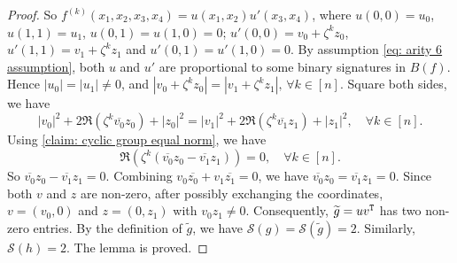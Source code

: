 \begin{proof}
    So $f^{(k)}(x_1,x_2,x_3,x_4)=u(x_1,x_2)u'(x_3,x_4)$, where $u(0,0)=u_0$, $u(1,1)=u_1$, $u(0,1)=u(1,0)=0$; $u'(0,0)=v_0+\zeta^k z_0$, $u'(1,1)=v_1+\zeta^k z_1$ and $u'(0,1)=u'(1,0)=0.$
    By assumption \eqref{eq: arity 6 assumption}, both $u$ and $u'$ are proportional to some binary signatures in $B(f)$.
    Hence $|u_0|=|u_1|\neq 0$, and $|v_0+\zeta^k z_0|=|v_1+\zeta^k z_1|,\,\forall k\in [n].$
    Square both sides, we have
    \begin{equation*}
        |v_0|^2+2\Re(\zeta^k\overline{v_0}z_0)+|z_0|^2=|v_1|^2+2\Re(\zeta^k\overline{v_1}z_1)+|z_1|^2,\quad \forall k\in[n].
    \end{equation*}
    Using \cref{claim: cyclic group equal norm}, we have 
    \begin{equation*}
        \Re(\zeta^k(\overline{v_0}z_0-\overline{v_1}z_1))=0,\quad \forall k\in [n].
    \end{equation*}
    So $\overline{v_0}z_0-\overline{v_1}z_1=0.$
    Combining $v_0\overline{z_0}+v_1\overline{z_1}=0$, we have $\overline{v_0}z_0=\overline{v_1}z_1=0.$
    Since both $v$ and $z$ are non-zero, after possibly exchanging the coordinates, $v=(v_0,0)$ and $z=(0,z_1)$ with $v_0z_1\neq 0.$
    Consequently, $\widetilde{g}=uv^{\tt T}$ has two non-zero entries.
    By the definition of $\widetilde{g}$, we have $\mathscr{S}(g)=\mathscr{S}(\widetilde{g})=2$.
    Similarly, $\mathscr{S}(h)=2.$
    The lemma is proved.
\end{proof}

